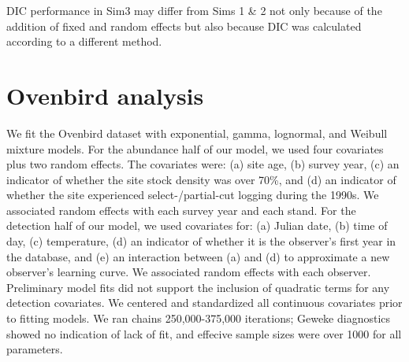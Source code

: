 \documentclass[useAMS,usenatbib,referee,12pt]{article}
\begin{document}
DIC performance in Sim3 may differ from Sims 1 \& 2 not only because of the addition of fixed and random effects but also because DIC was calculated according to a different method.
\fi





\section{Ovenbird analysis}\label{sec:ovenbirds}

We fit the Ovenbird dataset with exponential, gamma, lognormal, and Weibull mixture models.  
For the abundance half of our model, we used four covariates plus two random effects.  
The covariates were: (a) site age, (b) survey year, (c) an indicator of whether the site stock density was over 70\%, and (d) an indicator of whether the site experienced select-/partial-cut logging during the 1990s.  
We associated random effects with each survey year and each stand.
For the detection half of our model, we used covariates for: (a) Julian date, (b) time of day, (c) temperature, (d) an indicator of whether it is the observer's first year in the database, and (e) an interaction between (a) and (d) to approximate a new observer's learning curve.  
We associated random effects with each observer.  
Preliminary model fits did not support the inclusion of quadratic terms for any detection covariates.  
We centered and standardized all continuous covariates prior to fitting models.
We ran chains 250,000-375,000 iterations; Geweke diagnostics showed no indication of lack of fit, and effecive sample sizes were over 1000 for all parameters.


\end{document}
